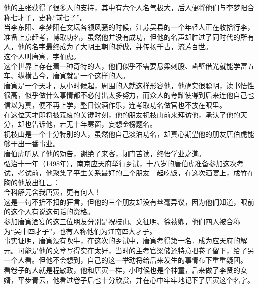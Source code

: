 \begin{multicols}{\theparacolNo}
他的主张获得了很多人的支持，其中有六个人名气极大，后人便将他们与李梦阳合称七才子，史称“前七子”。\\

当李东阳、李梦阳在文坛各领风骚的时候，江苏吴县的一个年轻人正在收拾行李，准备上京赶考，博取功名，虽然他并没有成功，但他的名声却胜过了同时代的所有人，他的名字最终成为了大明王朝的骄傲，并传扬千古，流芳百世。\\

这个人叫唐寅，字伯虎。\\

这个世界上存在着一种奇特的人，他们似乎不需要悬梁刺股、凿壁借光就能学富五车、纵横古今，唐寅就是一个这样的人。\\

唐寅是一个天才，从小时候起，周围的人就这样形容他，他确实很聪明，读书悟性很高，似乎做什么事情都不必付出太多努力，而众人的夸耀使得到后来连他自己也信以为真，便不再上学，整日饮酒作乐，连考取功名做官也不放在眼里。\\

在这位天才即将被荒废的关键时刻，他的朋友祝枝山前来拜访他，承认了他的天分，却也告诉他，若无十年寒窗，妄想金榜题名。\\

祝枝山是一个十分特别的人，虽然他自己淡泊功名，却真心期望他的朋友唐伯虎能够干出一番事业。\\

唐伯虎听从了他的劝告，谢绝了来客，闭门苦读，终悟学业之道。\\

弘治十一年（1498年），南京应天府举行乡试，十八岁的唐伯虎准备参加这次考试，考试前，他聚集了平生关系最好的三个朋友一起吃饭，在这次酒宴上，成竹在胸的他放出狂言：\\

今科解元舍我唐寅，更有何人！\\

这是一句不折不扣的狂言，但他的三个朋友却没有丝毫异议，因为他们知道，眼前的这个人有说这句话的资格。\\

参加唐寅酒宴的这三位朋友分别是祝枝山、文征明、徐祯卿，他们四人被合称为“吴中四才子”，也有人称他们为江南四大才子。\\

事实证明，唐寅没有吹牛，在这次的乡试中，唐寅考得第一名，成为应天府的解元。可能是他的文章写得实在太好，当时的主考官梁储还特意把卷子留下，给了另一个人看。但他不会想到，自己的这一举动将给后来发生的事情布下重重疑团。\\

看卷子的人就是程敏政，他和唐寅一样，小时候也是个神童，后来做了李贤的女婿，平步青云，他看过卷子后也十分欣赏，并在心中牢牢地记下了唐寅这个名字。\\


\end{multicols}
